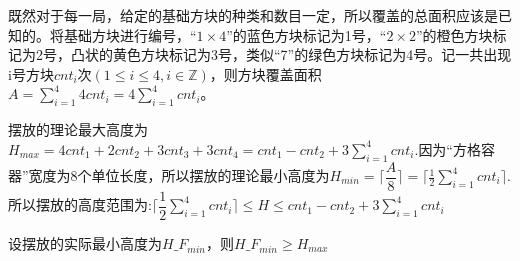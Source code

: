 \documentclass[lang=cn,a4paper]{elegantpaper}
\begin{document}
    既然对于每一局，给定的基础方块的种类和数目一定，所以覆盖的总面积应该是已知的。将基础方块进行编号，“$1\times4$”的蓝色方块标记为1号，“$2\times2$”的橙色方块标记为2号，凸状的黄色方块标记为3号，类似“7”的绿色方块标记为4号。记一共出现i号方块$cnt_i$次$(1\leqslant i\leqslant 4,i\in\mathbb{Z})$，则方块覆盖面积$\displaystyle A=\sum_{i=1}^4 4cnt_i=4\sum_{i=1}^4 cnt_i$。
    
    摆放的理论最大高度为$\displaystyle H_{max}=4cnt_1+2cnt_2+3cnt_3+3cnt_4=cnt_1-cnt_2+3\sum_{i=1}^4{cnt_i}. $因为“方格容器”宽度为8个单位长度，所以摆放的理论最小高度为$\displaystyle H_{min}=\lceil \dfrac{A}{8} \rceil=\lceil \frac{1}{2}\sum_{i=1}^4 cnt_i \rceil.$所以摆放的高度范围为:$\displaystyle \lceil \dfrac{1}{2} \sum_{i=1}^4 cnt_i\rceil \leqslant H \leqslant cnt_1-cnt_2+3\sum_{i=1}^4{cnt_i}$

    设摆放的实际最小高度为${H\_F}_{min}$，则${H\_F}_{min}\geqslant H_{max}$
\end{document}
